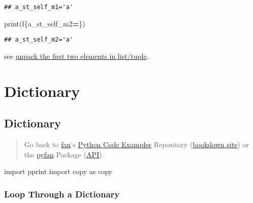 \documentclass[
]{book}
\newenvironment{Shaded}{\begin{snugshade}}{\end{snugshade}}
\newcommand{\BuiltInTok}[1]{#1}
\newcommand{\ImportTok}[1]{#1}
\newcommand{\NormalTok}[1]{#1}
\newcommand{\OperatorTok}[1]{\textcolor[rgb]{0.81,0.36,0.00}{\textbf{#1}}}
\newcommand{\SpecialCharTok}[1]{\textcolor[rgb]{0.00,0.00,0.00}{#1}}
\newcommand{\SpecialStringTok}[1]{\textcolor[rgb]{0.31,0.60,0.02}{#1}}
\begin{document}
\begin{verbatim}
## a_st_self_m1='a'
\end{verbatim}

\begin{Shaded}
\begin{Highlighting}[]
\BuiltInTok{print}\NormalTok{(}\SpecialStringTok{f\textquotesingle{}}\SpecialCharTok{\{}\NormalTok{a\_st\_self\_m2}\OperatorTok{=}\SpecialCharTok{\}}\SpecialStringTok{\textquotesingle{}}\NormalTok{)}
\end{Highlighting}
\end{Shaded}

\begin{verbatim}
## a_st_self_m2='a'
\end{verbatim}

see \href{https://stackoverflow.com/a/11371230/8280804}{unpack the first two elements in list/tuple}.

\hypertarget{dictionary}{%
\section{Dictionary}\label{dictionary}}

\hypertarget{dictionary-1}{%
\subsection{Dictionary}\label{dictionary-1}}

\begin{quote}
Go back to \href{http://fanwangecon.github.io/}{fan}'s \href{https://fanwangecon.github.io/Py4Econ/}{Python Code Examples} Repository (\href{https://fanwangecon.github.io/Py4Econ/bookdown}{bookdown site}) or the \href{https://pyfan.readthedocs.io/en/latest/}{pyfan} Package (\href{https://pyfan.readthedocs.io/en/latest/reference.html}{API}).
\end{quote}

\begin{Shaded}
\begin{Highlighting}[]
\ImportTok{import}\NormalTok{ pprint}
\ImportTok{import}\NormalTok{ copy }\ImportTok{as}\NormalTok{ copy}
\end{Highlighting}
\end{Shaded}

\hypertarget{loop-through-a-dictionary}{%
\subsubsection{Loop Through a Dictionary}\label{loop-through-a-dictionary}}
\end{document}
